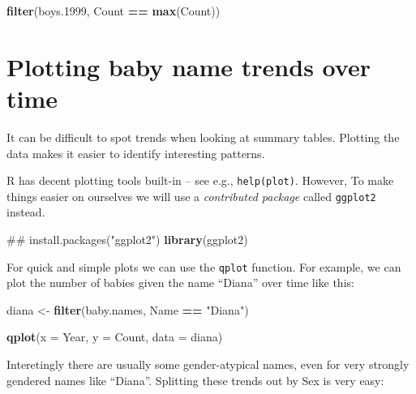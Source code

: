\documentclass[]{book}
\newenvironment{Shaded}{\begin{snugshade}}{\end{snugshade}}
\newcommand{\KeywordTok}[1]{\textcolor[rgb]{0.13,0.29,0.53}{\textbf{#1}}}
\newcommand{\DataTypeTok}[1]{\textcolor[rgb]{0.13,0.29,0.53}{#1}}
\newcommand{\DecValTok}[1]{\textcolor[rgb]{0.00,0.00,0.81}{#1}}
\newcommand{\StringTok}[1]{\textcolor[rgb]{0.31,0.60,0.02}{#1}}
\newcommand{\OperatorTok}[1]{\textcolor[rgb]{0.81,0.36,0.00}{\textbf{#1}}}
\newcommand{\NormalTok}[1]{#1}
\begin{document}
\begin{Shaded}
\begin{Highlighting}[]
\KeywordTok{filter}\NormalTok{(boys.}\DecValTok{1999}\NormalTok{, Count }\OperatorTok{==}\StringTok{ }\KeywordTok{max}\NormalTok{(Count))}
\end{Highlighting}
\end{Shaded}

\section{Plotting baby name trends over
time}\label{plotting-baby-name-trends-over-time}

It can be difficult to spot trends when looking at summary tables.
Plotting the data makes it easier to identify interesting patterns.

R has decent plotting tools built-in -- see e.g., \texttt{help(plot)}.
However, To make things easier on ourselves we will use a
\emph{contributed package} called \texttt{ggplot2} instead.

\begin{Shaded}
\begin{Highlighting}[]
\NormalTok{## install.packages("ggplot2")}
\KeywordTok{library}\NormalTok{(ggplot2)}
\end{Highlighting}
\end{Shaded}

For quick and simple plots we can use the \texttt{qplot} function. For
example, we can plot the number of babies given the name ``Diana'' over
time like this:

\begin{Shaded}
\begin{Highlighting}[]
\NormalTok{diana <-}\StringTok{ }\KeywordTok{filter}\NormalTok{(baby.names, Name }\OperatorTok{==}\StringTok{ "Diana"}\NormalTok{)}
\end{Highlighting}
\end{Shaded}

\begin{Shaded}
\begin{Highlighting}[]
\KeywordTok{qplot}\NormalTok{(}\DataTypeTok{x =}\NormalTok{ Year, }\DataTypeTok{y =}\NormalTok{ Count,}
     \DataTypeTok{data =}\NormalTok{ diana)}
\end{Highlighting}
\end{Shaded}

Interetingly there are usually some gender-atypical names, even for very
strongly gendered names like ``Diana''. Splitting these trends out by
Sex is very easy:
\end{document}
